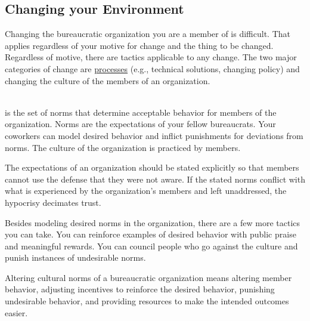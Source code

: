 \subsection*{Changing your Environment}


Changing the bureaucratic organization you are a member of is difficult. That applies regardless of your motive for change and the thing to be changed. Regardless of motive, there are tactics applicable to any change. 
The two major categories of change are 
%
\hyperref[sec:change-a-process]{processes} (e.g., technical solutions, changing policy)
and changing the \gls{culture} of the members of an organization.

\ \\

\iftoggle{glossarysubstitutionworks}{culture}{Culture} is the set of norms that determine acceptable behavior for members of the organization. Norms are the expectations of your fellow bureaucrats. Your coworkers can model desired behavior and inflict punishments for deviations from norms. The culture of the organization is practiced by members. 

The expectations of an organization should be stated explicitly so that members cannot use the defense that they were not aware. If the stated norms conflict with what is experienced by the organization's members and left unaddressed, the hypocrisy decimates trust. 

Besides modeling desired norms in the organization, there are a few more tactics you can take. 
You can reinforce examples of desired behavior with public praise and meaningful rewards. You can council people who go against the culture and punish instances of undesirable norms. 

Altering cultural norms of a bureaucratic organization means altering member behavior, adjusting incentives to reinforce the desired behavior, punishing undesirable behavior, and providing resources to make the intended outcomes easier. 


